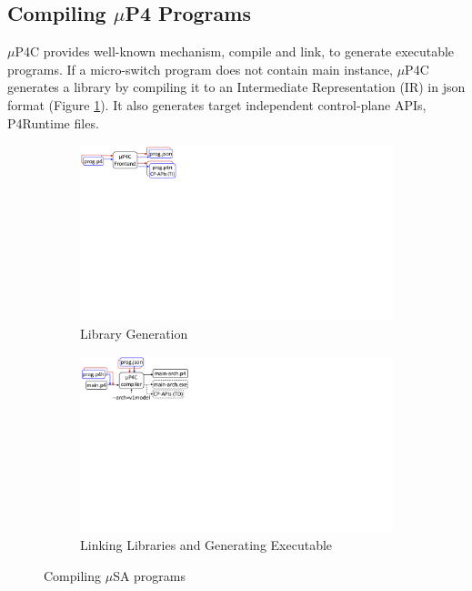\documentclass{hotnets19}
\begin{document}
\subsection*{Compiling $\mu$P4 Programs}
$\mu$P4C provides well-known mechanism, compile and link, to generate executable programs.
If a micro-switch program does not contain main instance, $\mu$P4C generates a library by compiling it to an Intermediate Representation (IR) in json format (Figure \ref{subfig:compiling-modules}).
It also generates target independent control-plane APIs, P4Runtime \cite{p4runtime} files.
\begin{figure}
    \begin{subfigure}{\linewidth}
        \centering
        \includegraphics[trim=0 435 665 0, clip,scale=0.5]{mp4c-frontend}
        \caption{Library Generation}
        \label{subfig:compiling-modules}
    \end{subfigure}
    \begin{subfigure}{\linewidth}
        \centering
        \includegraphics[trim=0 407 628 0, clip,scale=0.5]{mp4c-compiler}
        \caption{Linking Libraries and Generating Executable}
        \label{subfig:composition-translation-of-main-instance}
    \end{subfigure}
\caption{Compiling $\mu$SA programs}
\label{fig:compiling-msa-programs}
\end{figure}
\end{document}
